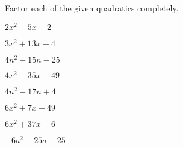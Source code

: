 \documentclass{report}
\theoremstyle{definition}
\begin{document}
\noindent Factor each of the given quadratics completely.
\begin{enumerate}

	\begin{minipage}[t]{0.45\linewidth}
		\item $2x^2-5x+2$\\
		\vspace{2.5cm}
	\end{minipage}
	\hfill
	\begin{minipage}[t]{0.45\linewidth}
		\item $3x^2+13x+4$\\
		\vspace{2.5cm}
	\end{minipage}
	\begin{minipage}[t]{0.45\linewidth}
		\item $4n^2-15n-25$\\
		\vspace{2.5cm}
	\end{minipage}
	\hfill
	\begin{minipage}[t]{0.45\linewidth}
		\item $4x^2-35x+49$\\
		\vspace{2.5cm}
	\end{minipage}
	\begin{minipage}[t]{0.45\linewidth}
		\item $4n^2-17n+4$\\
		\vspace{2.5cm}
	\end{minipage}
	\hfill
	\begin{minipage}[t]{0.45\linewidth}
		\item $6x^2+7x-49$\\
		\vspace{2.5cm}
	\end{minipage}
	\begin{minipage}[t]{0.45\linewidth}
		\item $6x^2+37x+6 $\\
		\vspace{2.5cm}
	\end{minipage}
	\hfill
	\begin{minipage}[t]{0.45\linewidth}
		\item $-6a^2-25a-25$\\
		\vspace{2.5cm}
	\end{minipage}
	\begin{minipage}[t]{0.45\linewidth}

\end{minipage}
\end{enumerate}
\end{document}

